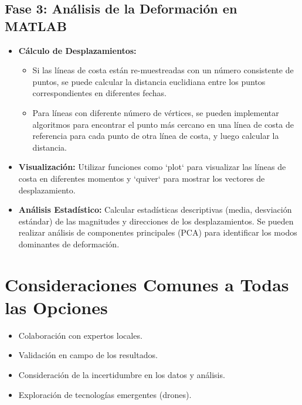 \documentclass{article}
\begin{document}
\subsection*{Fase 3: Análisis de la Deformación en MATLAB}

\begin{itemize}
    \item \textbf{Cálculo de Desplazamientos:}
    \begin{itemize}
        \item Si las líneas de costa están re-muestreadas con un número consistente de puntos, se puede calcular la distancia euclidiana entre los puntos correspondientes en diferentes fechas.
        \item Para líneas con diferente número de vértices, se pueden implementar algoritmos para encontrar el punto más cercano en una línea de costa de referencia para cada punto de otra línea de costa, y luego calcular la distancia.
    \end{itemize}
    \item \textbf{Visualización:} Utilizar funciones como `plot` para visualizar las líneas de costa en diferentes momentos y `quiver` para mostrar los vectores de desplazamiento.
    \item \textbf{Análisis Estadístico:} Calcular estadísticas descriptivas (media, desviación estándar) de las magnitudes y direcciones de los desplazamientos. Se pueden realizar análisis de componentes principales (PCA) para identificar los modos dominantes de deformación.
\end{itemize}

\section*{Consideraciones Comunes a Todas las Opciones}

\begin{itemize}
    \item Colaboración con expertos locales.
    \item Validación en campo de los resultados.
    \item Consideración de la incertidumbre en los datos y análisis.
    \item Exploración de tecnologías emergentes (drones).
\end{itemize}
\end{document}
